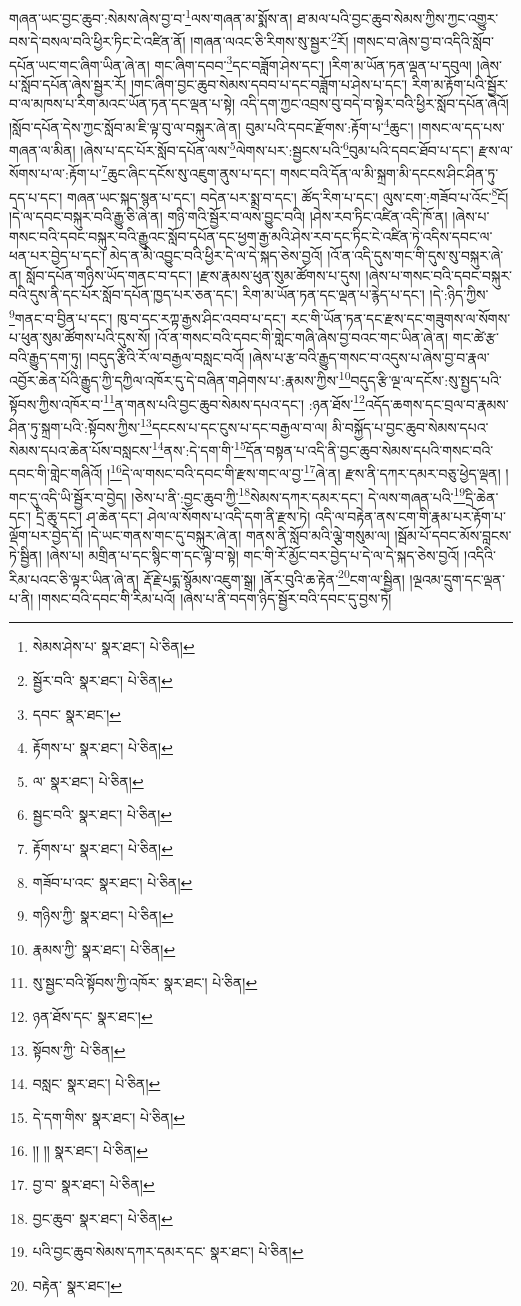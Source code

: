 གཞན་ཡང་བྱང་ཆུབ་:སེམས་ཞེས་བྱ་བ་\footnote{སེམས་ཤེས་པ་  སྣར་ཐང་།  པེ་ཅིན། }ལས་གཞན་མ་སྨོས་ན། ཐ་མལ་པའི་བྱང་ཆུབ་སེམས་ཀྱིས་ཀྱང་འགྱུར་བས་དེ་བསལ་བའི་ཕྱིར་ཏིང་ངེ་འཛིན་ནོ། །གཞན་ལའང་ཅི་རིགས་སུ་སྦྱར་\footnote{སྦྱོར་བའི་  སྣར་ཐང་།  པེ་ཅིན། }རོ། །གསང་བ་ཞེས་བྱ་བ་འདིའི་སློབ་དཔོན་ཡང་གང་ཞིག་ཡིན་ཞེ་ན། གང་ཞིག་དབབ་\footnote{དབང་  སྣར་ཐང་། }དང་བཟློག་ཤེས་དང་། །རིག་མ་ཡོན་ཏན་ལྡན་པ་དབུལ། །ཞེས་པ་སློབ་དཔོན་ཞེས་སྦྱར་རོ། །གང་ཞིག་བྱང་ཆུབ་སེམས་དབབ་པ་དང་བཟློག་པ་ཤེས་པ་དང་། རིག་མ་རྟོག་པའི་སྦྱོར་བ་ལ་མཁས་པ་རིག་མའང་ཡོན་ཏན་དང་ལྡན་པ་སྟེ། འདི་དག་ཀྱང་འབྲས་བུ་བདེ་བ་སྟེར་བའི་ཕྱིར་སློབ་དཔོན་ཞེའོ། །སློབ་དཔོན་དེས་ཀྱང་སློབ་མ་ཇི་ལྟ་བུ་ལ་བསྐུར་ཞེ་ན། བུམ་པའི་དབང་རྫོགས་:རྟོག་པ་\footnote{རྟོགས་པ་  སྣར་ཐང་།  པེ་ཅིན། }ཆུང་། །གསང་ལ་དད་པས་གཞན་ལ་མིན། །ཞེས་པ་དང་པོར་སློབ་དཔོན་ལས་\footnote{ལ་  སྣར་ཐང་།  པེ་ཅིན། }ལེགས་པར་:སྦྱངས་པའི་\footnote{སྦྱང་བའི་  སྣར་ཐང་།  པེ་ཅིན། }བུམ་པའི་དབང་ཐོབ་པ་དང་། རྫས་ལ་སོགས་པ་ལ་:རྟོག་པ་\footnote{རྟོགས་པ་  སྣར་ཐང་།  པེ་ཅིན། }ཆུང་ཞིང་དངོས་སུ་འཇུག་ནུས་པ་དང་། གསང་བའི་དོན་ལ་མི་སྐྲག་མི་དངངས་ཤིང་ཤིན་ཏུ་དད་པ་དང་། གཞན་ཡང་སྐད་སྙན་པ་དང་། བདེན་པར་སྨྲ་བ་དང་། ཚོད་རིག་པ་དང་། ལུས་ངག་:གཟོབ་པ་འོང་\footnote{གཟོབ་པ་འང་  སྣར་ཐང་།  པེ་ཅིན། }ངོ། །དེ་ལ་དབང་བསྐུར་བའི་རྒྱུ་ཅི་ཞེ་ན། གཉི་གའི་སྦྱོར་བ་ལས་བྱུང་བའི། །ཤེས་རབ་ཏིང་འཛིན་འདི་ཁོ་ན། །ཞེས་པ་གསང་བའི་དབང་བསྐུར་བའི་རྒྱུའང་སློབ་དཔོན་དང་ཕྱག་རྒྱ་མའི་ཤེས་རབ་དང་ཏིང་ངེ་འཛིན་ཏེ་འདིས་དབང་ལ་ཕན་པར་བྱེད་པ་དང་། མེད་ན་མི་འབྱུང་བའི་ཕྱིར་དེ་ལ་དེ་སྐད་ཅེས་བྱའོ། །འོ་ན་འདི་དུས་གང་གི་དུས་སུ་བསྐུར་ཞེ་ན། སློབ་དཔོན་གཉིས་ཡོད་གནང་བ་དང་། །རྫས་རྣམས་ཕུན་སུམ་ཚོགས་པ་དུས། །ཞེས་པ་གསང་བའི་དབང་བསྐུར་བའི་དུས་ནི་དང་པོར་སློབ་དཔོན་ཁྱད་པར་ཅན་དང་། རིག་མ་ཡོན་ཏན་དང་ལྡན་པ་རྙེད་པ་དང་། །དེ་:ཉིད་ཀྱིས་\footnote{གཉིས་ཀྱི་  སྣར་ཐང་།  པེ་ཅིན། }གནང་བ་བྱིན་པ་དང་། ཁུ་བ་དང་རཀྟ་རྒྱས་ཤིང་འབབ་པ་དང་། རང་གི་ཡོན་ཏན་དང་རྫས་དང་གཟུགས་ལ་སོགས་པ་ཕུན་སུམ་ཚོགས་པའི་དུས་སོ། །འོ་ན་གསང་བའི་དབང་གི་གླེང་གཞི་ཞེས་བྱ་བའང་གང་ཡིན་ཞེ་ན། གང་ཚེ་རྩ་བའི་རྒྱུད་དག་ཏུ། །བདུད་རྩིའི་རོ་ལ་བརྒྱལ་བསླང་བའོ། །ཞེས་པ་རྩ་བའི་རྒྱུད་གསང་བ་འདུས་པ་ཞེས་བྱ་བ་རྣལ་འབྱོར་ཆེན་པོའི་རྒྱུད་ཀྱི་དཀྱིལ་འཁོར་དུ་དེ་བཞིན་གཤེགས་པ་:རྣམས་ཀྱིས་\footnote{རྣམས་ཀྱི་  སྣར་ཐང་།  པེ་ཅིན། }བདུད་རྩི་ལྔ་ལ་དངོས་:སུ་སྤྱད་པའི་སྟོབས་ཀྱིས་འཁོར་བ་\footnote{སུ་སྦྱང་བའི་སྟོབས་ཀྱི་འཁོར་  སྣར་ཐང་།  པེ་ཅིན། }ན་གནས་པའི་བྱང་ཆུབ་སེམས་དཔའ་དང་། :ཉན་ཐོས་\footnote{ཉན་ཐོས་དང་  སྣར་ཐང་། }འདོད་ཆགས་དང་བྲལ་བ་རྣམས་ཤིན་ཏུ་སྐྲག་པའི་:སྟོབས་ཀྱིས་\footnote{སྟོབས་ཀྱི་  པེ་ཅིན། }དངངས་པ་དང་ངུས་པ་དང་བརྒྱལ་བ་ལ། མི་བསྐྱོད་པ་བྱང་ཆུབ་སེམས་དཔའ་སེམས་དཔའ་ཆེན་པོས་བསླངས་\footnote{བསླང་  སྣར་ཐང་།  པེ་ཅིན། }ནས་:དེ་དག་གི་\footnote{དེ་དག་གིས་  སྣར་ཐང་།  པེ་ཅིན། }དོན་བསྟན་པ་འདི་ནི་བྱང་ཆུབ་སེམས་དཔའི་གསང་བའི་དབང་གི་གླེང་གཞིའོ། །\footnote{།། །།  སྣར་ཐང་།  པེ་ཅིན། }དེ་ལ་གསང་བའི་དབང་གི་རྫས་གང་ལ་བྱ་\footnote{བྱ་བ་  སྣར་ཐང་།  པེ་ཅིན། }ཞེ་ན། རྫས་ནི་དཀར་དམར་བཅུ་ཕྱེད་ལྡན། །གང་དུ་འདི་ཡི་སྦྱོར་བ་བྱེད། །ཅེས་པ་ནི་:བྱང་ཆུབ་ཀྱི་\footnote{བྱང་ཆུབ་  སྣར་ཐང་།  པེ་ཅིན། }སེམས་དཀར་དམར་དང་། དེ་ལས་གཞན་པའི་\footnote{པའི་བྱང་ཆུབ་སེམས་དཀར་དམར་དང་  སྣར་ཐང་།  པེ་ཅིན། }དྲི་ཆེན་དང་། དྲི་ཆུ་དང་། ཤ་ཆེན་དང་། ཤེལ་ལ་སོགས་པ་འདི་དག་ནི་རྫས་ཏེ། འདི་ལ་བརྟེན་ནས་ངག་གི་རྣམ་པར་རྟོག་པ་ལྡོག་པར་བྱེད་དོ། །དེ་ཡང་གནས་གང་དུ་བསྐུར་ཞེ་ན། གནས་ནི་སློབ་མའི་ལྕེ་གསུམ་ལ། །སྦོམ་པོ་དབང་མོས་བླངས་ཏེ་སྦྱིན། །ཞེས་པ། མགྲིན་པ་དང་སྙིང་ག་དང་ལྟེ་བ་སྟེ། གང་གི་རོ་མྱོང་བར་བྱེད་པ་དེ་ལ་དེ་སྐད་ཅེས་བྱའོ། །འདིའི་རིམ་པའང་ཅི་ལྟར་ཡིན་ཞེ་ན། རྡོ་རྗེ་པདྨ་སྙོམས་འཇུག་སྒྲ། །ནོར་བུའི་ཆ་རྟེན་\footnote{བརྟེན་  སྣར་ཐང་། }ངག་ལ་སྦྱིན། །ལྔའམ་དྲུག་དང་ལྡན་པ་ནི། །གསང་བའི་དབང་གི་རིམ་པའོ། །ཞེས་པ་ནི་བདག་ཉིད་སྦྱོར་བའི་དབང་དུ་བྱས་ཏེ། 